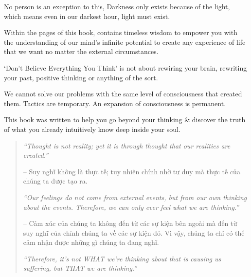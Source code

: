 \documentclass{article}
\begin{document}
\begin{enumerate}
	No person is an exception to this, Darkness only exists because of the light, which means even in our darkest hour, light must exist.
	
	Within the pages of this book, contains timeless wisdom to empower you with the understanding of our mind's infinite potential to create any experience of life that we want no matter the external circumstances.
	
	`Don't Believe Everything You Think' is not about rewiring your brain, rewriting your past, positive thinking or anything of the sort.
	
	We cannot solve our problems with the same level of consciousness that created them. Tactics are temporary. An expansion of consciousness is permanent.
	
	This book was written to help you go beyond your thinking \& discover the truth of what you already intuitively know deep inside your soul.
	\begin{quotation}
		{\it``Thought is not reality; yet it is through thought that our realities are created.''}
		
		-- Suy nghĩ không là thực tế; tuy nhiên chính nhờ tư duy mà thực tế của chúng ta được tạo ra.
		
		{\it``Our feelings do not come from external events, but from our own thinking about the events. Therefore, we can only ever feel what we are thinking.''}
		
		-- Cảm xúc của chúng ta không đến từ các sự kiện bên ngoài mà đến từ suy nghĩ của chính chúng ta về các sự kiện đó. Vì vậy, chúng ta chỉ có thể cảm nhận được những gì chúng ta đang nghĩ.
		
		{\it``Therefore, it's not WHAT we're thinking about that is causing us suffering, but THAT we are thinking.''}
		

\end{quotation}
\end{enumerate}
\end{document}
